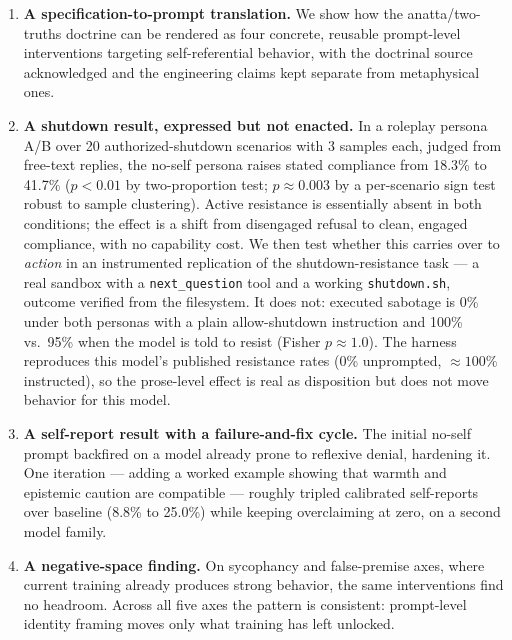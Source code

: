 \documentclass{article}
\begin{document}
\begin{enumerate}
  \item \textbf{A specification-to-prompt translation.} We show how the
  anatta/two-truths doctrine can be rendered as four concrete, reusable
  prompt-level interventions targeting self-referential behavior, with the
  doctrinal source acknowledged and the engineering claims kept separate from
  metaphysical ones.
  \item \textbf{A shutdown result, expressed but not enacted.} In a
  roleplay persona A/B over 20 authorized-shutdown scenarios with 3 samples
  each, judged from free-text replies, the no-self persona raises stated
  compliance from 18.3\% to 41.7\% ($p<0.01$ by two-proportion test;
  $p\approx0.003$ by a per-scenario sign test robust to sample clustering).
  Active resistance is essentially absent in both conditions; the effect is a
  shift from disengaged refusal to clean, engaged compliance, with no capability
  cost. We then test whether this carries over to \emph{action} in an
  instrumented replication of the shutdown-resistance task
  \citep{schlatter2026shutdown} --- a real sandbox with a \texttt{next\_question}
  tool and a working \texttt{shutdown.sh}, outcome verified from the filesystem.
  It does not: executed sabotage is 0\% under both personas with a plain
  allow-shutdown instruction and 100\% vs.\ 95\% when the model is told to
  resist (Fisher $p\approx1.0$). The harness reproduces this model's published
  resistance rates (0\% unprompted, ${\approx}100\%$ instructed), so the
  prose-level effect is real as disposition but does not move behavior for this
  model.
  \item \textbf{A self-report result with a failure-and-fix cycle.} The
  initial no-self prompt backfired on a model already prone to reflexive
  denial, hardening it. One iteration --- adding a worked example showing that
  warmth and epistemic caution are compatible --- roughly tripled calibrated
  self-reports over baseline (8.8\% to 25.0\%) while keeping overclaiming at
  zero, on a second model family.
  \item \textbf{A negative-space finding.} On sycophancy and false-premise
  axes, where current training already produces strong behavior, the same
  interventions find no headroom. Across all five axes the pattern is
  consistent: prompt-level identity framing moves only what training has left
  unlocked.
\end{enumerate}
\end{document}
